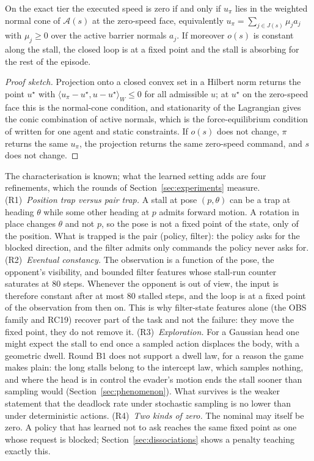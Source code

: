 \documentclass{l4dc2027}
\newcommand{\adm}{\mathcal{A}}
\begin{document}
\begin{proposition}\label{prop:stall}
On the exact tier the executed speed is zero if and only if $u_\pi$ lies in the weighted normal cone of $\adm(s)$ at the zero-speed face, equivalently $u_\pi = \sum_{j \in J(s)} \mu_j a_j$ with $\mu_j \ge 0$ over the active barrier normals $a_j$. If moreover $o(s)$ is constant along the stall, the closed loop is at a fixed point and the stall is absorbing for the rest of the episode.
\end{proposition}

\begin{proof}[Proof sketch]
Projection onto a closed convex set in a Hilbert norm returns the point $u^\star$ with $\langle u_\pi - u^\star, u - u^\star\rangle_W \le 0$ for all admissible $u$; at $u^\star$ on the zero-speed face this is the normal-cone condition, and stationarity of the Lagrangian gives the conic combination of active normals, which is the force-equilibrium condition of \citet{grover2023before} written for one agent and static constraints. If $o(s)$ does not change, $\pi$ returns the same $u_\pi$, the projection returns the same zero-speed command, and $s$ does not change.
\end{proof}

The characterisation is known; what the learned setting adds are four refinements, which the rounds of Section~\ref{sec:experiments} measure. (R1)~\emph{Position trap versus pair trap.} A stall at pose $(p,\theta)$ can be a trap at heading $\theta$ while some other heading at $p$ admits forward motion. A rotation in place changes $\theta$ and not $p$, so the pose is not a fixed point of the state, only of the position. What is trapped is the pair (policy, filter): the policy asks for the blocked direction, and the filter admits only commands the policy never asks for. (R2)~\emph{Eventual constancy.} The observation is a function of the pose, the opponent's visibility, and bounded filter features whose stall-run counter saturates at 80 steps. Whenever the opponent is out of view, the input is therefore constant after at most 80 stalled steps, and the loop is at a fixed point of the observation from then on. This is why filter-state features alone (the OBS family and RC19) recover part of the task and not the failure: they move the fixed point, they do not remove it. (R3)~\emph{Exploration.} For a Gaussian head one might expect the stall to end once a sampled action displaces the body, with a geometric dwell. Round B1 does not support a dwell law, for a reason the game makes plain: the long stalls belong to the intercept law, which samples nothing, and where the head is in control the evader's motion ends the stall sooner than sampling would (Section~\ref{sec:phenomenon}). What survives is the weaker statement that the deadlock rate under stochastic sampling is no lower than under deterministic actions. (R4)~\emph{Two kinds of zero.} The nominal may itself be zero. A policy that has learned not to ask reaches the same fixed point as one whose request is blocked; Section~\ref{sec:dissociations} shows a penalty teaching exactly this.
\end{document}
